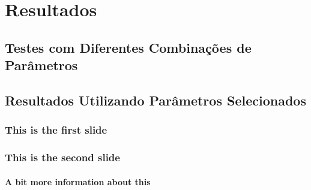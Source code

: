 \documentclass{beamer}
\begin{document}
	\section[Resultados]{Resultados}
	\subsection[Testes com Diferentes Combinações de Parâmetros]{Testes com Diferentes Combinações de Parâmetros}
	\subsection[Resultados Utilizando Parâmetros Selecionados]{Resultados Utilizando Parâmetros Selecionados}
	
	
	\begin{frame}
		\frametitle{This is the first slide}
	\end{frame}
	\begin{frame}
		\frametitle{This is the second slide}
		\framesubtitle{A bit more information about this}
	\end{frame}
	
	
\end{document}
